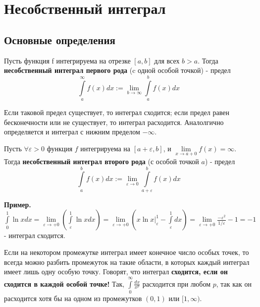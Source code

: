 \chapter{Несобственный интеграл}
\section{Основные определения}
\begin{defin}
Пусть функция f интегрируема на отрезке $[a,b]$ для всех  $b>a$. 
Тогда \textbf{несобственный интеграл первого рода} (c одной особой точкой)
- предел 
$$\int\limits_{a}^{\infty}f(x)dx:=\lim\limits_{b\to\infty}\int\limits_{a}^{b}
f(x)dx$$
\end{defin}
Если таковой предел существует, то интеграл сходится; если предел равен 
бесконечности или не существует, то интеграл расходится. Аналолгично
определяется и интеграл с нижним пределом $-\infty$.
\begin{defin}
    Пусть $\forall \varepsilon>0$ функция $f$ интегрируема на $[a+\varepsilon,
    b]$, и $\lim\limits_{x \to a+0} f(x)=\infty$. Тогда \textbf{несобственный
    интеграл второго рода} (с особой точкой $a$) - предел 
    $$\int\limits_{a}^{b} f(x)dx:=\lim\limits_{\varepsilon \to 0} 
    \int\limits_{a+\varepsilon}^{b} f(x)dx$$
\end{defin}

\textbf{Пример.} $\int\limits_{0}^{1} \ln xdx=\lim\limits_{\varepsilon \to 
+0} \left( \int\limits_{\varepsilon}^{1}\ln xdx\right)=
\lim\limits_{\varepsilon \to +0}\left( x\ln x\big|_\varepsilon^1-
\int\limits_{\varepsilon}^1dx  \right)=\lim\limits_{\varepsilon \to +0}
\frac{-\varepsilon^2}{1 /\varepsilon}-1=-1$ - интеграл сходится.

Если на некотором промежутке интеграл имеет конечное число особых точек, то 
всегда можно разбить промежуток на такие области, в которых каждый интеграл 
имеет лишь одну особую точку. Говорят, что интеграл \textbf{сходится, 
если он сходится в каждой особой точке!} Так,
$\int\limits_{0}^{\infty} \frac{dx}{x^p}$ расходится при любом $p$, так 
как он расходится хотя бы на одном из промежутков  $(0,1)$ или
$[1,\infty)$.

